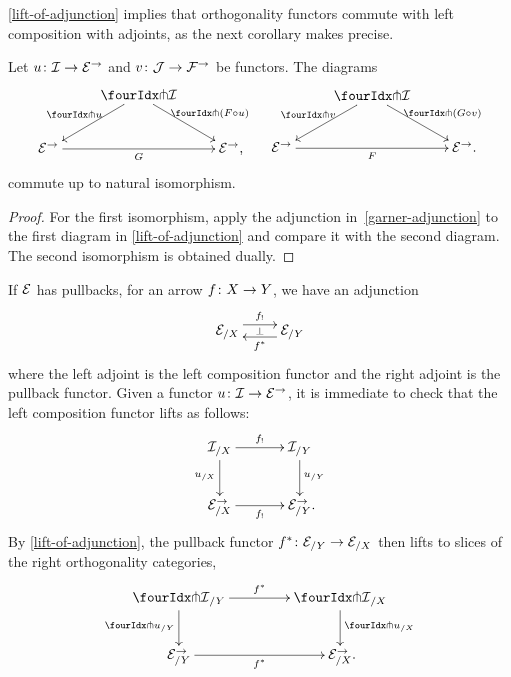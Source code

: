 \documentclass[reqno,10pt,a4paper,oneside,draft]{amsart}
\begin{document}
\cref{lift-of-adjunction} implies that orthogonality functors commute with left composition with adjoints, as the next corollary makes precise.

\begin{corollary} \label{pitchfork-adjunction}
Let $u \co \cal{I} \to \catE^\to$ and $v \co \cal{J} \to \cal{F}^\to$ be functors.
The diagrams
\begin{align*}
\xycenter{
&
  \liftr{\cal{I}}
  \ar[dr]^-{\liftr{(F \cc u)}}
  \ar[dl]_-{\liftr{u}}
&\\
  \catE^\to
  \ar[rr]_-{G}
&&
  \catE^\to
\rlap{,}}
&&
\xycenter{
&
  \liftl{\cal{I}}
  \ar[dl]_-{\liftl{v}}
  \ar[dr]^-{\liftl{(G \cc v)}}
&\\
  \catE^\to
  \ar[rr]_-{F}
&&
  \catE^\to
\rlap{.}}
\end{align*}
commute up to natural isomorphism.
\end{corollary}

\begin{proof}
For the first isomorphism, apply the adjunction in~\eqref{garner-adjunction} to the first diagram in \cref{lift-of-adjunction} and compare it with the second diagram.
The second isomorphism is obtained dually.
\end{proof}

\begin{example} \label{exa:composition-pullback-lift}
If $\cal{E}$ has pullbacks, for an arrow $f \co X \to Y$, we have an adjunction
\[
\xymatrix{
  \catE_{/X}
  \ar@<1ex>[r]^{f_!}
  \ar@{}[r]|{\bot}
&
  \catE_{/Y}
  \ar@<1ex>[l]^{f^*}
}
\]
where the left adjoint is the left composition functor and the right adjoint is the pullback functor.
Given a functor $u \co \cal{I} \to \catE^\to$, it is immediate to check that the left composition functor lifts as follows:
\[
\xymatrix@C+1em{
  \cal{I}_{/X}
  \ar[r]^-{f_!}
  \ar[d]_{u_{/X}}
&
  \cal{I}_{/Y}
  \ar[d]^{u_{/Y}}
\\
  \calE_{/X}^\to
  \ar[r]_-{f_!}
&
  \calE_{/Y}^\to
\rlap{.}}
\]
By \cref{lift-of-adjunction}, the pullback functor $f^* \co \catE_{/Y} \to \catE_{/X}$ then lifts to slices of the right orthogonality categories,
\[
\xymatrix@C=1.5cm{
  \liftr{\cal{I}}_{/Y}
  \ar[d]_{{\liftr{u}}_{/Y}}
  \ar[r]^{f^*}
&
  \liftr{\cal{I}}_{/X}
  \ar[d]^{{\liftr{u}}_{/X}}
\\
  {\catE}_{/Y}^\to
  \ar[r]_{f^*}
&
  \catE_{/X}^\to
\rlap{.}}
\]
\end{example}

\end{document}
